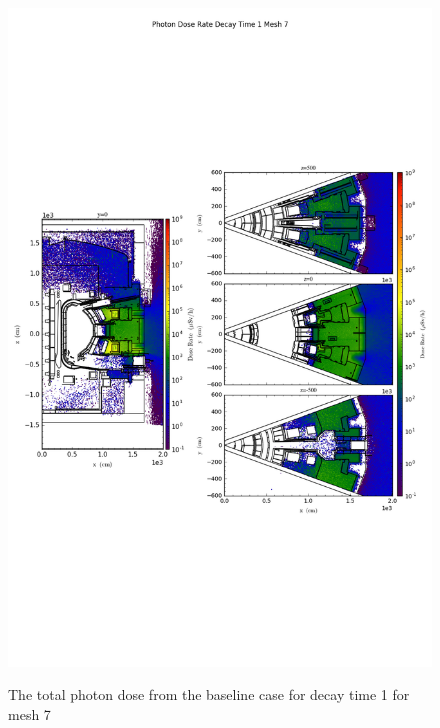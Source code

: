 \begin{figure}[ht!]
\centering
\includegraphics[trim={0cm 9cm 0cm 10cm},clip,scale=0.75]{../plots/final_model_nob4c/Photon_Dose_Rate_Decay_Time_1_Mesh_7.png}
\label{fig:photons_dc1_no4bc_m7_flux}
\caption{The total photon dose from the baseline case for decay time 1 for mesh 7}
\end{figure}
